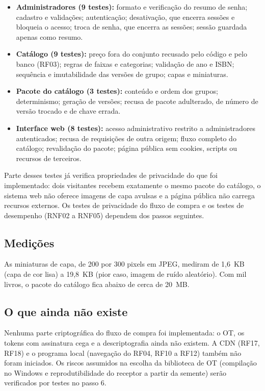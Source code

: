 \documentclass[12pt, oneside, a4paper, english, brazil]{abntex2}
\begin{document}
\begin{itemize}
\item \textbf{Administradores (9 testes):} formato e verificação do resumo de
senha; cadastro e validações; autenticação; desativação, que encerra sessões
e bloqueia o acesso; troca de senha, que encerra as sessões; sessão guardada
apenas como resumo.
\item \textbf{Catálogo (9 testes):} preço fora do conjunto recusado pelo
código e pelo banco (RF03); regras de faixas e categorias; validação de ano e
ISBN; sequência e imutabilidade das versões de grupo; capas e miniaturas.
\item \textbf{Pacote do catálogo (3 testes):} conteúdo e ordem dos grupos;
determinismo; geração de versões; recusa de pacote adulterado, de número de
versão trocado e de chave errada.
\item \textbf{Interface web (8 testes):} acesso administrativo restrito a
administradores autenticados; recusa de requisições de outra origem; fluxo
completo do catálogo; revalidação do pacote; página pública sem cookies,
scripts ou recursos de terceiros.
\end{itemize}

Parte desses testes já verifica propriedades de privacidade do que foi
implementado: dois visitantes recebem exatamente o mesmo pacote do catálogo, o
sistema web não oferece imagens de capa avulsas e a página pública não carrega
recursos externos. Os testes de privacidade do fluxo de compra e os testes de
desempenho (RNF02 a RNF05) dependem dos passos seguintes.

\subsection{Medições}

As miniaturas de capa, de 200 por 300 pixels em JPEG, mediram de 1,6~KB (capa
de cor lisa) a 19,8~KB (pior caso, imagem de ruído aleatório). Com mil livros,
o pacote do catálogo fica abaixo de cerca de 20~MB.

\subsection{O que ainda não existe}

Nenhuma parte criptográfica do fluxo de compra foi implementada: o OT, os
tokens com assinatura cega e a descriptografia ainda não existem. A CDN
(RF17, RF18) e o programa local (navegação do RF04, RF10 a RF12) também não
foram iniciados. Os riscos assumidos na escolha da biblioteca de OT
(compilação no Windows e reprodutibilidade do receptor a partir da semente)
serão verificados por testes no passo 6.
\end{document}
